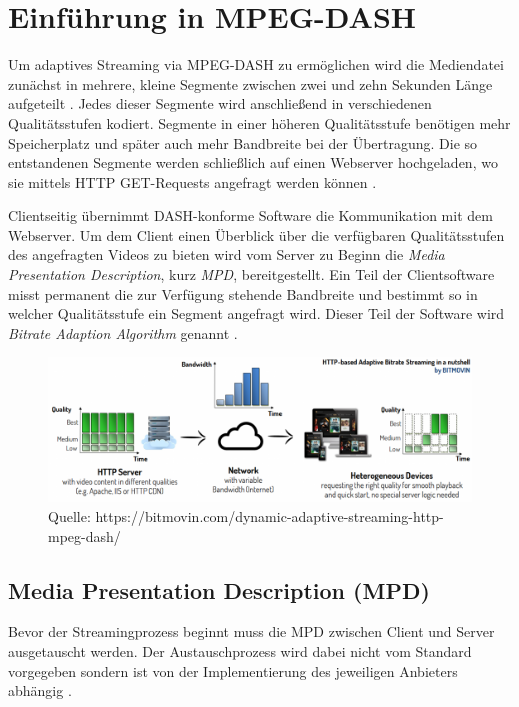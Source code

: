 \documentclass[paper = a4, fontsize = 12pt, parskip = half]{scrartcl} %
\begin{document}
\section{Einführung in MPEG-DASH}
Um adaptives Streaming via MPEG-DASH zu ermöglichen wird die Mediendatei zunächst in mehrere, kleine Segmente zwischen zwei und zehn Sekunden Länge aufgeteilt \cite{international_organization_for_standardization_isoiec_nodate}. Jedes dieser Segmente wird anschließend in verschiedenen Qualitätsstufen kodiert. Segmente in einer höheren Qualitätsstufe benötigen mehr Speicherplatz und später auch mehr Bandbreite bei der Übertragung. Die so entstandenen Segmente werden schließlich auf einen Webserver hochgeladen, wo sie mittels HTTP GET-Requests angefragt werden können \cite{sodagar_mpeg-dash_2011}. 

Clientseitig übernimmt DASH-konforme Software die Kommunikation mit dem Webserver. Um dem Client einen Überblick über die verfügbaren Qualitätsstufen des angefragten Videos zu bieten wird vom Server zu Beginn die \textit{Media Presentation Description}, kurz \textit{MPD}, bereitgestellt. Ein Teil der Clientsoftware misst permanent die zur Verfügung stehende Bandbreite und bestimmt so in welcher Qualitätsstufe ein Segment angefragt wird. Dieser Teil der Software wird \textit{Bitrate Adaption Algorithm} genannt \cite{bentaleb_survey_2019}. 

	\begin{figure}
		\centering
		\includegraphics[width=14cm]{images/adaptive-streaming-basic.png}
		\caption{Quelle: https://bitmovin.com/dynamic-adaptive-streaming-http-mpeg-dash/}
	\end{figure}


\subsection{Media Presentation Description (MPD)}
Bevor der Streamingprozess beginnt muss die MPD zwischen Client und Server ausgetauscht werden. Der Austauschprozess wird dabei nicht vom Standard vorgegeben sondern ist von der Implementierung des jeweiligen Anbieters abhängig \cite{sodagar_mpeg-dash_2011}.
\end{document}
